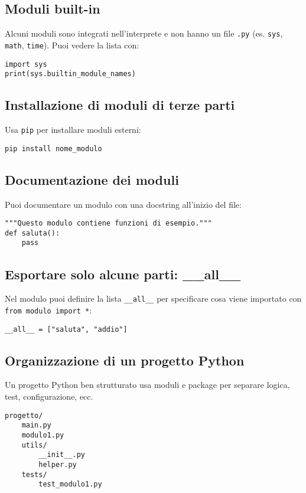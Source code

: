 \documentclass[a4paper,12pt]{article}
\begin{document}
\subsection*{Moduli built-in}
Alcuni moduli sono integrati nell'interprete e non hanno un file \texttt{.py} (es. \texttt{sys}, \texttt{math}, \texttt{time}). Puoi vedere la lista con:

\begin{lstlisting}
import sys
print(sys.builtin_module_names)
\end{lstlisting}

\subsection*{Installazione di moduli di terze parti}
Usa \texttt{pip} per installare moduli esterni:

\begin{verbatim}
pip install nome_modulo
\end{verbatim}

\subsection*{Documentazione dei moduli}
Puoi documentare un modulo con una docstring all'inizio del file:

\begin{lstlisting}
"""Questo modulo contiene funzioni di esempio."""
def saluta():
    pass
\end{lstlisting}

\subsection*{Esportare solo alcune parti: \_\_all\_\_}
Nel modulo puoi definire la lista \texttt{\_\_all\_\_} per specificare cosa viene importato con \texttt{from modulo import *}:

\begin{lstlisting}
__all__ = ["saluta", "addio"]
\end{lstlisting}

\subsection*{Organizzazione di un progetto Python}
Un progetto Python ben strutturato usa moduli e package per separare logica, test, configurazione, ecc.

\begin{verbatim}
progetto/
    main.py
    modulo1.py
    utils/
        __init__.py
        helper.py
    tests/
        test_modulo1.py
\end{verbatim}
\end{document}
